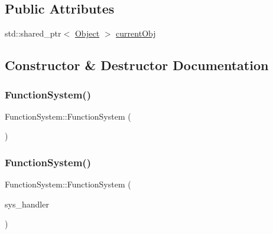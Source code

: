 \subsection*{Public Attributes}
\begin{DoxyCompactItemize}
\item 
std\+::shared\+\_\+ptr$<$ \hyperlink{classObject}{Object} $>$ \hyperlink{classFunctionSystem_a59f2a49d91338ced0a79d3898412fcaf}{current\+Obj}
\end{DoxyCompactItemize}


\subsection{Constructor \& Destructor Documentation}
\mbox{\label{classFunctionSystem_a66e3b5e5118f00a940c3e4a2f138c9c6}} 
\subsubsection{\texorpdfstring{Function\+System()}{FunctionSystem()}\hspace{0.1cm}{\footnotesize\ttfamily [1/3]}}
{\footnotesize\ttfamily Function\+System\+::\+Function\+System (\begin{DoxyParamCaption}{ }\end{DoxyParamCaption})}

\mbox{\label{classFunctionSystem_a8c2420b3c21af6e84bdf0ef23ccdb0a6}} 
\subsubsection{\texorpdfstring{Function\+System()}{FunctionSystem()}\hspace{0.1cm}{\footnotesize\ttfamily [2/3]}}
{\footnotesize\ttfamily Function\+System\+::\+Function\+System (\begin{DoxyParamCaption}\item[{\hyperlink{classSystemHandler}{System\+Handler} $\ast$}]{sys\+\_\+handler }\end{DoxyParamCaption})}

\mbox{\label{classFunctionSystem_aa847d30455d0868179326505ec6384cd}} 
